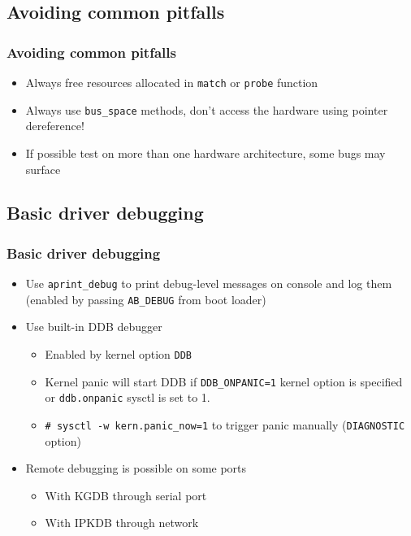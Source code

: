 \documentclass[dvipsnames,table]{beamer}
\begin{document}
\subsection{Avoiding common pitfalls}

\begin{frame}
\frametitle{Avoiding common pitfalls}

\begin{itemize}
	\item Always free resources allocated in {\tt match} or {\tt probe} function
	\item Always use {\tt bus\_space} methods, don't access the hardware using pointer dereference!
	\item If possible test on more than one hardware architecture, some bugs may surface
\end{itemize}
\end{frame}

\subsection{Basic driver debugging}

\begin{frame}
\frametitle{Basic driver debugging} 
\begin{itemize}
	\item Use {\tt aprint\_debug} to print debug-level messages on console and log them (enabled by passing {\tt AB\_DEBUG} from boot loader)
	\item Use built-in DDB debugger
	\begin{itemize}
			\item Enabled by kernel option {\tt DDB}
			\item Kernel panic will start DDB if {\tt DDB\_ONPANIC=1} kernel option is specified or {\tt ddb.onpanic} sysctl is set to 1.
			\item {\tt \# sysctl -w kern.panic\_now=1} to trigger panic manually ({\tt DIAGNOSTIC} option)
	\end{itemize}	
	\item Remote debugging is possible on some ports
	\begin{itemize}
			\item With KGDB through serial port
			\item With IPKDB through network
	\end{itemize}	
\end{itemize}
\end{frame}
\end{document}
